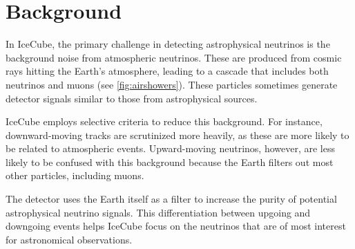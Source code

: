 \section{Background}

In IceCube, the primary challenge in detecting astrophysical neutrinos is the background noise from atmospheric neutrinos.
These are produced from cosmic rays hitting the Earth's atmosphere, leading to a cascade that includes both neutrinos and muons (see \cref{fig:airshowers}).
These particles sometimes generate detector signals similar to those from astrophysical sources.

IceCube employs selective criteria to reduce this background.
For instance, downward-moving tracks are scrutinized more heavily, as these are more likely to be related to atmospheric events.
Upward-moving neutrinos, however, are less likely to be confused with this background because the Earth filters out most other particles, including muons.

The detector uses the Earth itself as a filter to increase the purity of potential astrophysical neutrino signals.
This differentiation between upgoing and downgoing events helps IceCube focus on the neutrinos that are of most interest for astronomical observations.